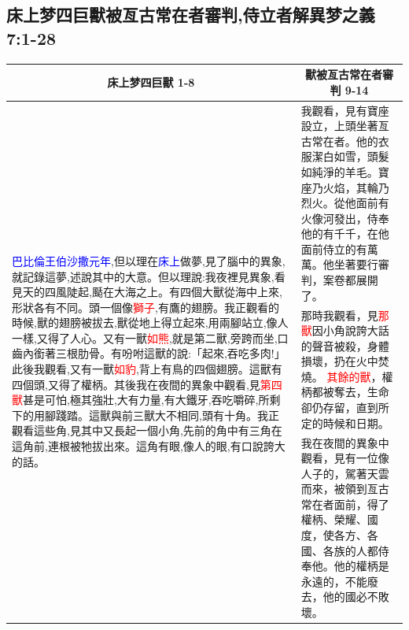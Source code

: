 \subsection{床上梦四巨獸被亙古常在者審判,侍立者解異梦之義 7:1-28}
\begin{table}[H]
\centering
\begin{tabular}{p{9.75cm}|p{7.50cm}}\hline\hline
\multicolumn{1}{c|}{床上梦四巨獸 1-8}&\multicolumn{1}{c}{獸被亙古常在者審判 9-14}\\\hline
\multirow{3}{9.96cm}{\textcolor{blue}{巴比倫王伯沙撒元年},但以理在\textcolor{blue}{床上}做夢,見了腦中的異象,就記錄這夢,述說其中的大意。但以理說:我夜裡見異象,看見天的四風陡起,颳在大海之上。有四個大獸從海中上來,形狀各有不同。頭一個像\textcolor{red}{獅子},有鷹的翅膀。我正觀看的時候,獸的翅膀被拔去,獸從地上得立起來,用兩腳站立,像人一樣,又得了人心。又有一獸\textcolor{red}{如熊},就是第二獸,旁跨而坐,口齒內銜著三根肋骨。有吩咐這獸的說:「起來,吞吃多肉!」此後我觀看,又有一獸\textcolor{red}{如豹},背上有鳥的四個翅膀。這獸有四個頭,又得了權柄。其後我在夜間的異象中觀看,見\textcolor{red}{第四獸}甚是可怕,極其強壯,大有力量,有大鐵牙,吞吃嚼碎,所剩下的用腳踐踏。這獸與前三獸大不相同,頭有十角。我正觀看這些角,見其中又長起一個小角,先前的角中有三角在這角前,連根被牠拔出來。這角有眼,像人的眼,有口說誇大的話。}
&我觀看，見有寶座設立，上頭坐著亙古常在者。他的衣服潔白如雪，頭髮如純淨的羊毛。寶座乃火焰，其輪乃烈火。從他面前有火像河發出，侍奉他的有千千，在他面前侍立的有萬萬。他坐著要行審判，案卷都展開了。\\\cline{2-2}
&那時我觀看，見\textcolor{red}{那獸}因小角說誇大話的聲音被殺，身體損壞，扔在火中焚燒。 \textcolor{red}{其餘的獸}，權柄都被奪去，生命卻仍存留，直到所定的時候和日期。\\\cline{2-2}
&我在夜間的異象中觀看，見有一位像人子的，駕著天雲而來，被領到亙古常在者面前，得了權柄、榮耀、國度，使各方、各國、各族的人都侍奉他。他的權柄是永遠的，不能廢去，他的國必不敗壞。\\\hline
\end{tabular}
\end{table}

